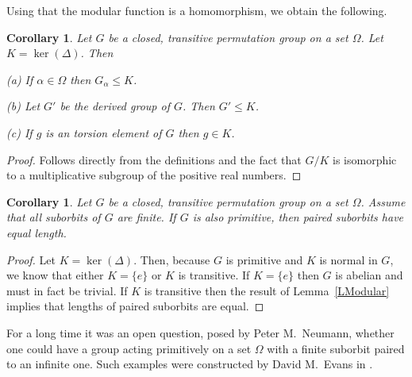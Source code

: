 \documentclass{emsprocart}
\newtheorem{corollary}[theorem]{Corollary}
\theoremstyle{definition}
\begin{document}
Using that the modular function is a homomorphism, we obtain the following.

\begin{corollary}
Let $G$ be a closed, transitive permutation
group on a set $\Omega$.
Let $K=\ker(\Delta)$.  Then

(a) If $\alpha\in \Omega$ then $G_\alpha\leq K$.

(b) Let $G'$ be the derived group of $G$.  Then $G'\leq K$.

(c) If $g$ is an torsion element of $G$ then $g\in K$.
\end{corollary}

\noindent
\begin{proof} Follows directly from the definitions and the fact
that $G/K$
is isomorphic to a multiplicative subgroup of the positive real numbers. \end{proof}

\begin{corollary}
Let $G$ be a closed, transitive permutation
group on a set $\Omega$.  Assume that
all suborbits of $G$ are finite.
If $G$  is also
primitive, then paired suborbits have equal length.
\end{corollary}

\noindent
\begin{proof}  Let $K=\ker(\Delta)$.  Then, because $G$ is primitive
and $K$ is normal in $G$,
we know that either $K=\{e\}$ or $K$ is transitive.  If $K=\{e\}$
then $G$ is abelian and must in fact be trivial.
If $K$ is transitive
then the result of Lemma~\ref{LModular} implies that lengths of paired
suborbits are equal.  \end{proof}

\bigskip

For a long time it was an open question, posed by Peter M.~Neumann,
whether  one could have a group
acting primitively on a set $\Omega$ with a finite suborbit
paired to an infinite one.   Such examples were constructed by David M.~Evans in \cite{Evans2001}.
\bigskip
\end{document}
